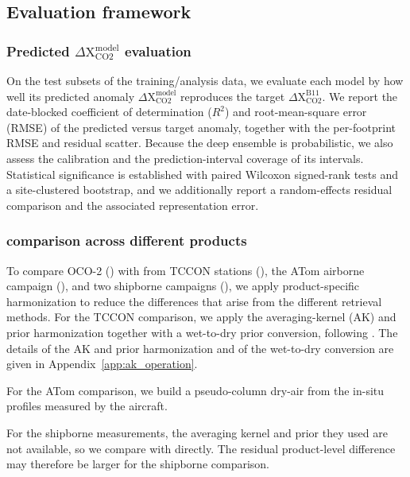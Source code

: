\subsection{Evaluation framework}
\label{sec:method-eval}

\subsubsection{Predicted $\Delta\mathrm{X_{CO2}^{model}}$ evaluation}
\label{sec:method-eval-del-xco2}

On the test subsets of the training/analysis data, we evaluate each model by how
well its predicted anomaly $\Delta\mathrm{X_{CO2}^{model}}$ reproduces the target
$\Delta\mathrm{X_{CO2}^{B11}}$. We report the date-blocked coefficient of
determination ($R^2$) and root-mean-square error (RMSE) of the predicted versus
target anomaly, together with the per-footprint RMSE and residual scatter. Because
the deep ensemble is probabilistic, we also assess the calibration and the
prediction-interval coverage of its intervals. Statistical significance is
established with paired Wilcoxon signed-rank tests and a site-clustered bootstrap,
and we additionally report a random-effects residual comparison and the
associated representation error.


\subsubsection{\xco comparison across different products}
\label{sec:method-eval-obs-xco2}

To compare OCO-2 \xco (\xcooco) with \xco
from TCCON stations (\xcotccon), the ATom airborne campaign
(\xcoatom), and two shipborne campaigns
(\xcoship), we apply product-specific harmonization to reduce the
differences that arise from the different retrieval methods. For the TCCON
comparison, we apply the averaging-kernel (AK) and prior harmonization together
with a wet-to-dry prior conversion, following
\citet{wunch2011tccon_network,das2025oco2_v111_tccon_ggg2020,rodgers2003intercomparison}.
The details of the AK and prior harmonization and of the wet-to-dry conversion are
given in Appendix~\ref{app:ak_operation}.

For the ATom comparison, we build a pseudo-column dry-air \xcoatom
from the in-situ  profiles measured by the aircraft.

For the shipborne measurements, the averaging kernel and prior they used are not
available, so we compare \xcooco with \xcoship
directly. The residual product-level difference may therefore be larger for the
shipborne comparison.

